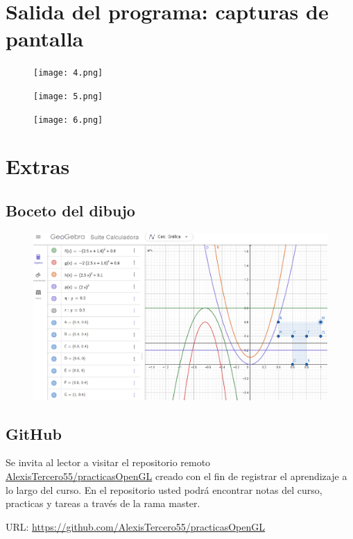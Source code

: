 \documentclass[12pt, letterpaper]{article}
\begin{document}
\section{Salida del programa: capturas de pantalla}
\begin{figure}[h!]
    \centering
    \texttt{[image: 4.png]}
\end{figure}
\newpage
\begin{figure}[h!]
    \centering
    \texttt{[image: 5.png]}
\end{figure}
\begin{figure}[h!]
    \centering
    \texttt{[image: 6.png]}
\end{figure}
\newpage
\section{Extras}

\subsection{Boceto del dibujo}
\begin{figure}[h!]
    \centering
   \includegraphics[scale=0.5]{help.png}
\end{figure}

\subsection{GitHub}
Se invita al lector a visitar el repositorio remoto 
\href{https://github.com/AlexisTercero55/practicasOpenGL}{AlexisTercero55/practicasOpenGL}
creado con el fin de registrar el aprendizaje a lo largo del curso. En el repositorio usted podrá encontrar notas del curso, practicas y tareas a través de la rama master.\vspace{2ex}

URL: \url{https://github.com/AlexisTercero55/practicasOpenGL}




\end{document}
